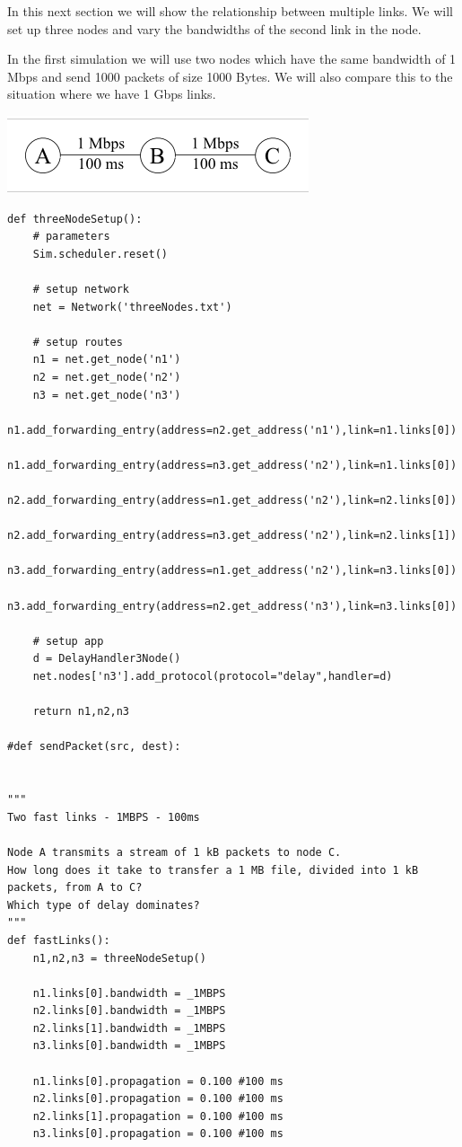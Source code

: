 \documentclass[11pt]{article}
\begin{document}
In this next section we will show the relationship between multiple links. We will set up three nodes and vary the bandwidths of the second link in the node.

In the first simulation we will use two nodes which have the same bandwidth of 1 Mbps and send 1000 packets of size 1000 Bytes. We will also compare this to the situation where we have 1 Gbps links.

\includegraphics{ThreeFast.png}

\begin{lstlisting}
def threeNodeSetup():
    # parameters
    Sim.scheduler.reset()

    # setup network
    net = Network('threeNodes.txt')

    # setup routes
    n1 = net.get_node('n1')
    n2 = net.get_node('n2')
    n3 = net.get_node('n3')
    n1.add_forwarding_entry(address=n2.get_address('n1'),link=n1.links[0])
    n1.add_forwarding_entry(address=n3.get_address('n2'),link=n1.links[0])
    n2.add_forwarding_entry(address=n1.get_address('n2'),link=n2.links[0])
    n2.add_forwarding_entry(address=n3.get_address('n2'),link=n2.links[1])
    n3.add_forwarding_entry(address=n1.get_address('n2'),link=n3.links[0])
    n3.add_forwarding_entry(address=n2.get_address('n3'),link=n3.links[0])

    # setup app
    d = DelayHandler3Node()
    net.nodes['n3'].add_protocol(protocol="delay",handler=d)
    
    return n1,n2,n3

#def sendPacket(src, dest):


"""
Two fast links - 1MBPS - 100ms

Node A transmits a stream of 1 kB packets to node C. 
How long does it take to transfer a 1 MB file, divided into 1 kB packets, from A to C? 
Which type of delay dominates?
"""
def fastLinks():
    n1,n2,n3 = threeNodeSetup()

    n1.links[0].bandwidth = _1MBPS
    n2.links[0].bandwidth = _1MBPS
    n2.links[1].bandwidth = _1MBPS
    n3.links[0].bandwidth = _1MBPS

    n1.links[0].propagation = 0.100 #100 ms
    n2.links[0].propagation = 0.100 #100 ms
    n2.links[1].propagation = 0.100 #100 ms
    n3.links[0].propagation = 0.100 #100 ms




\end{lstlisting}
\end{document}
